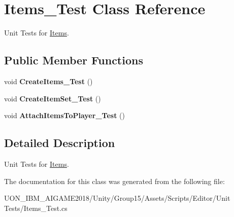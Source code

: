 \hypertarget{class_items___test}{}\section{Items\+\_\+\+Test Class Reference}
\label{class_items___test}


Unit Tests for \mbox{\hyperlink{class_items}{Items}}.  


\subsection*{Public Member Functions}
\begin{DoxyCompactItemize}
\item 
\mbox{\label{class_items___test_af3d9432fd0dacf8716a1e0a50e642df3}} 
void {\bfseries Create\+Items\+\_\+\+Test} ()
\item 
\mbox{\label{class_items___test_a2891c44bc7f9131017df9cddb5fc163c}} 
void {\bfseries Create\+Item\+Set\+\_\+\+Test} ()
\item 
\mbox{\label{class_items___test_a806431bc31e50464f95323f395057066}} 
void {\bfseries Attach\+Items\+To\+Player\+\_\+\+Test} ()
\end{DoxyCompactItemize}


\subsection{Detailed Description}
Unit Tests for \mbox{\hyperlink{class_items}{Items}}. 

The documentation for this class was generated from the following file\+:\begin{DoxyCompactItemize}
\item 
U\+O\+N\+\_\+\+I\+B\+M\+\_\+\+A\+I\+G\+A\+M\+E2018/\+Unity/\+Group15/\+Assets/\+Scripts/\+Editor/\+Unit Tests/Items\+\_\+\+Test.\+cs\end{DoxyCompactItemize}
